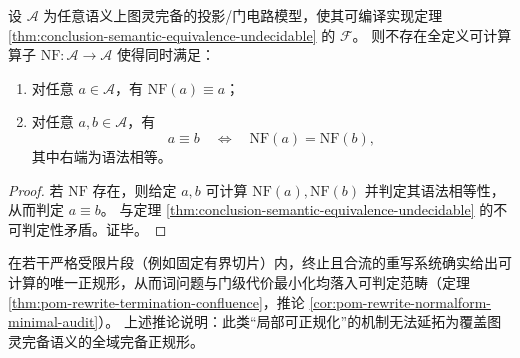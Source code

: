 \begin{corollary}[图灵完备门演算不存在可计算的完备正规形]\label{cor:conclusion-no-computable-complete-normal-form}
设 \(\mathcal A\) 为任意语义上图灵完备的投影/门电路模型，使其可编译实现定理 \ref{thm:conclusion-semantic-equivalence-undecidable} 的 \(\mathcal F\)。
则不存在全定义可计算算子
\(
\mathrm{NF}:\mathcal A\to\mathcal A
\)
使得同时满足：
\begin{enumerate}
\normalfont
  \item 对任意 \(a\in\mathcal A\)，有 \(\mathrm{NF}(a)\equiv a\)；
  \item 对任意 \(a,b\in\mathcal A\)，有
  \[
  a\equiv b\quad\Longleftrightarrow\quad \mathrm{NF}(a)=\mathrm{NF}(b),
  \]
  其中右端为语法相等。
\end{enumerate}
\end{corollary}
\begin{proof}
若 \(\mathrm{NF}\) 存在，则给定 \(a,b\) 可计算 \(\mathrm{NF}(a),\mathrm{NF}(b)\) 并判定其语法相等性，从而判定 \(a\equiv b\)。
与定理 \ref{thm:conclusion-semantic-equivalence-undecidable} 的不可判定性矛盾。证毕。
\end{proof}

\begin{remark}
在若干严格受限片段（例如固定有界切片）内，终止且合流的重写系统确实给出可计算的唯一正规形，从而词问题与门级代价最小化均落入可判定范畴（定理 \ref{thm:pom-rewrite-termination-confluence}，推论 \ref{cor:pom-rewrite-normalform-minimal-audit}）。
上述推论说明：此类“局部可正规化”的机制无法延拓为覆盖图灵完备语义的全域完备正规形。
\end{remark}

\endinput
